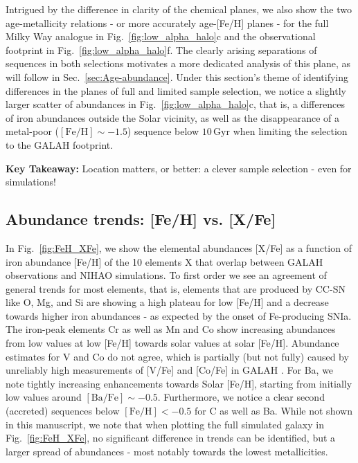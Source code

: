 \documentclass[fleqn,usenatbib]{mnras}
\begin{document}
Intrigued by the difference in clarity of the chemical planes, we also show the two age-metallicity relations - or more accurately age-[Fe/H] planes - for the full Milky Way analogue in Fig.~\ref{fig:low_alpha_halo}c and the observational footprint in Fig.~\ref{fig:low_alpha_halo}f. The clearly arising separations of sequences in both selections motivates a more dedicated analysis of this plane, as will follow in Sec.~\ref{sec:Age-abundance}. Under this section's theme of identifying differences in the planes of full and limited sample selection, we notice a slightly larger scatter of abundances in Fig.~\ref{fig:low_alpha_halo}c, that is, a differences of iron abundances outside the Solar vicinity, as well as the disappearance of a metal-poor ($\mathrm{[Fe/H]} \sim -1.5$) sequence below $10\,\mathrm{Gyr}$ when limiting the selection to the GALAH footprint.

\textbf{Key Takeaway:} Location matters, or better: a clever sample selection - even for simulations!

\subsection{Abundance trends: [Fe/H] vs. [X/Fe]} \label{sec:feh_xfe}

In Fig.~\ref{fig:FeH_XFe}, we show the elemental abundances [X/Fe] as a function of iron abundance [Fe/H] of the 10 elements X that overlap between GALAH observations and NIHAO simulations. To first order we see an agreement of general trends for most elements, that is, elements that are produced by CC-SN like O, Mg, and Si are showing a high plateau for low [Fe/H] and a decrease towards higher iron abundances - as expected by the onset of Fe-producing SNIa. The iron-peak elements Cr as well as Mn and Co show increasing abundances from low values at low [Fe/H] towards solar values at solar [Fe/H]. Abundance estimates for V and Co do not agree, which is partially (but not fully) caused by unreliably high measurements of [V/Fe] and [Co/Fe] in GALAH \citet{Buder2021}. For Ba, we note tightly increasing enhancements towards Solar [Fe/H], starting from initially low values around $\mathrm{[Ba/Fe]} \sim -0.5$. Furthermore, we notice a clear second (accreted) sequences below $\mathrm{[Fe/H]} < -0.5$ for C as well as Ba. While not shown in this manuscript, we note that when plotting the full simulated galaxy in Fig.~\ref{fig:FeH_XFe}, no significant difference in trends can be identified, but a larger spread of abundances - most notably towards the lowest metallicities.
\end{document}
